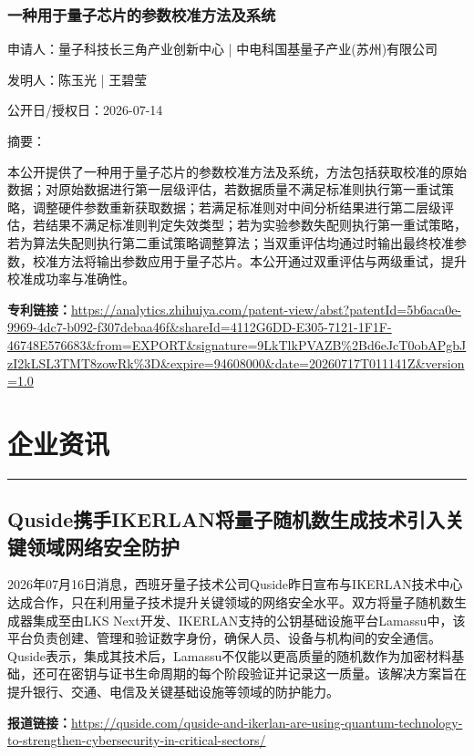 \documentclass[12pt,a4paper]{ctexart}
\begin{document}
\subsubsection{ 一种用于量子芯片的参数校准方法及系统 }

申请人：量子科技长三角产业创新中心 | 中电科国基量子产业(苏州)有限公司

发明人：陈玉光 | 王碧莹

公开日/授权日：2026-07-14

摘要：

本公开提供了一种用于量子芯片的参数校准方法及系统，方法包括获取校准的原始数据；对原始数据进行第一层级评估，若数据质量不满足标准则执行第一重试策略，调整硬件参数重新获取数据；若满足标准则对中间分析结果进行第二层级评估，若结果不满足标准则判定失效类型；若为实验参数失配则执行第一重试策略，若为算法失配则执行第二重试策略调整算法；当双重评估均通过时输出最终校准参数，校准方法将输出参数应用于量子芯片。本公开通过双重评估与两级重试，提升校准成功率与准确性。

\noindent\textbf{专利链接：}\url{https://analytics.zhihuiya.com/patent-view/abst?patentId=5b6aca0e-9969-4dc7-b092-f307debaa46f&shareId=4112G6DD-E305-7121-1F1F-46748E576683&from=EXPORT&signature=9LkTlkPVAZB%2Bd6eJcT0obAPgbJzI2kLSL3TMT8zowRk%3D&expire=94608000&date=20260717T011141Z&version=1.0}




\newpage
\section{企业资讯}
\vspace{-0.5em}
\noindent\rule{\linewidth}{1.5pt}

\subsection{ Quside携手IKERLAN将量子随机数生成技术引入关键领域网络安全防护 }

2026年07月16日消息，西班牙量子技术公司Quside昨日宣布与IKERLAN技术中心达成合作，只在利用量子技术提升关键领域的网络安全水平。双方将量子随机数生成器集成至由LKS Next开发、IKERLAN支持的公钥基础设施平台Lamassu中，该平台负责创建、管理和验证数字身份，确保人员、设备与机构间的安全通信。Quside表示，集成其技术后，Lamassu不仅能以更高质量的随机数作为加密材料基础，还可在密钥与证书生命周期的每个阶段验证并记录这一质量。该解决方案旨在提升银行、交通、电信及关键基础设施等领域的防护能力。

\noindent\textbf{报道链接：}\url{https://quside.com/quside-and-ikerlan-are-using-quantum-technology-to-strengthen-cybersecurity-in-critical-sectors/}
\end{document}
